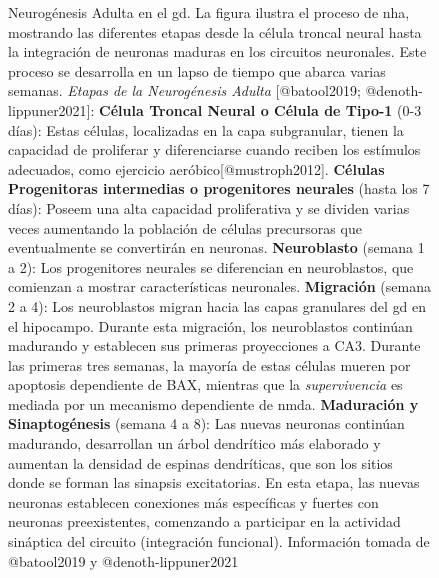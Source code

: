 \documentclass[
  11pt]{../MastersDoctoralThesisUNAM}
\begin{document}
\begin{figure}


\caption[Neurogénesis Adulta
hipocampal]{\label{fig-neurogenesishipo}Neurogénesis Adulta en el
\ac{gd}. La figura ilustra el proceso de \ac{nha}, mostrando las
diferentes etapas desde la célula troncal neural hasta la integración de
neuronas maduras en los circuitos neuronales. Este proceso se desarrolla
en un lapso de tiempo que abarca varias semanas. \emph{Etapas de la
Neurogénesis Adulta} {[}@batool2019; @denoth-lippuner2021{]}:
\textbf{Célula Troncal Neural o Célula de Tipo-1} (0-3 días): Estas
células, localizadas en la capa subgranular, tienen la capacidad de
proliferar y diferenciarse cuando reciben los estímulos adecuados, como
ejercicio aeróbico{[}@mustroph2012{]}. \textbf{Células Progenitoras
intermedias o progenitores neurales} (hasta los 7 días): Poseem una alta
capacidad proliferativa y se dividen varias veces aumentando la
población de células precursoras que eventualmente se convertirán en
neuronas. \textbf{Neuroblasto} (semana 1 a 2): Los progenitores neurales
se diferencian en neuroblastos, que comienzan a mostrar características
neuronales. \textbf{Migración} (semana 2 a 4): Los neuroblastos migran
hacia las capas granulares del \ac{gd} en el hipocampo. Durante esta
migración, los neuroblastos continúan madurando y establecen sus
primeras proyecciones a CA3. Durante las primeras tres semanas, la
mayoría de estas células mueren por apoptosis dependiente de BAX,
mientras que la \emph{supervivencia} es mediada por un mecanismo
dependiente de \ac{nmda}. \textbf{Maduración y Sinaptogénesis} (semana 4
a 8): Las nuevas neuronas continúan madurando, desarrollan un árbol
dendrítico más elaborado y aumentan la densidad de espinas dendríticas,
que son los sitios donde se forman las sinapsis excitatorias. En esta
etapa, las nuevas neuronas establecen conexiones más específicas y
fuertes con neuronas preexistentes, comenzando a participar en la
actividad sináptica del circuito (integración funcional). Información
tomada de @batool2019 y @denoth-lippuner2021}

\end{figure}%
\end{document}
